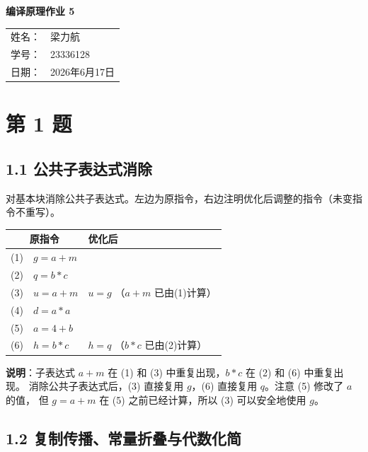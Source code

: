 \documentclass[12pt]{article}
\begin{document}
\begin{center}
    {\LARGE\bfseries 编译原理作业 5\par}
    \vspace{1.0cm}
    {\large
    \begin{tabular}{rl}
    姓名：& 梁力航 \\
    学号：& 23336128 \\
    日期：& 2026年6月17日
    \end{tabular}\par}
\end{center}

\vspace{0.8cm}

\section*{第 1 题}

\subsection*{1.1 公共子表达式消除}

对基本块消除公共子表达式。左边为原指令，右边注明优化后调整的指令（未变指令不重写）。

\begin{center}
\begin{tabular}{lll}
\toprule
\multicolumn{2}{c}{\textbf{原指令}} & \textbf{优化后} \\
\midrule
(1) & $g = a + m$ & \\
(2) & $q = b * c$ & \\
(3) & $u = a + m$ & $u = g$ \quad（$a+m$ 已由(1)计算）\\
(4) & $d = a * a$ & \\
(5) & $a = 4 + b$ & \\
(6) & $h = b * c$ & $h = q$ \quad（$b*c$ 已由(2)计算）\\
\bottomrule
\end{tabular}
\end{center}

\textbf{说明}：子表达式 $a+m$ 在 (1) 和 (3) 中重复出现，$b*c$ 在 (2) 和 (6) 中重复出现。
消除公共子表达式后，(3) 直接复用 $g$，(6) 直接复用 $q$。注意 (5) 修改了 $a$ 的值，
但 $g = a+m$ 在 (5) 之前已经计算，所以 (3) 可以安全地使用 $g$。

\subsection*{1.2 复制传播、常量折叠与代数化简}
\end{document}

